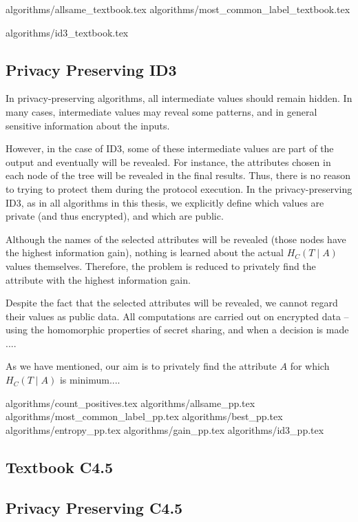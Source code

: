 {algorithms/allsame_textbook.tex}
{algorithms/most_common_label_textbook.tex}

{algorithms/id3_textbook.tex}



\subsection{Privacy Preserving ID3}\label{s:pp-id3}


In privacy-preserving algorithms, all intermediate values should remain hidden.
In many cases, intermediate values may reveal some patterns, and in general sensitive information about the inputs.

However, in the case of ID3, some of these intermediate values are part of the output and eventually will be revealed.
For instance, the attributes chosen in each node of the tree will be revealed in the final results.
Thus, there is no reason to trying to protect them during the protocol execution.
In the privacy-preserving ID3, as in all algorithms in this thesis, we explicitly define which values are private (and thus encrypted), and which are public.

Although the names of the selected attributes will be revealed (those nodes have the highest information gain), nothing is learned about the actual $H_C(T \mid A)$ values themselves.
Therefore, the problem is reduced to privately find the attribute with the highest information gain.

Despite the fact that the selected attributes will be revealed, we cannot regard their values as public data.
All computations are carried out on encrypted data -- using the homomorphic properties of secret sharing, and when a decision is made ....



As we have mentioned, our aim is to privately find the attribute $A$ for which $H_C(T \mid A)$ is minimum....


{algorithms/count_positives.tex}
{algorithms/allsame_pp.tex}
{algorithms/most_common_label_pp.tex}
{algorithms/best_pp.tex}
{algorithms/entropy_pp.tex}
{algorithms/gain_pp.tex}
{algorithms/id3_pp.tex}




\subsection{Textbook C4.5}\label{s:c45}

\subsection{Privacy Preserving C4.5}\label{s:pp-c45}


